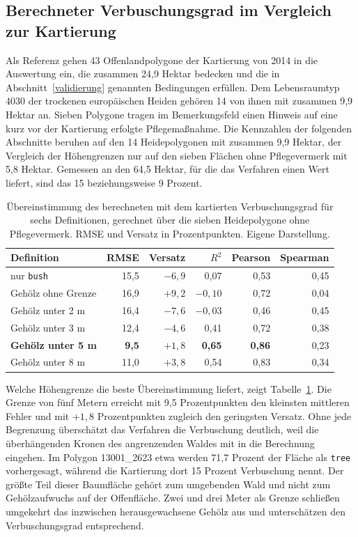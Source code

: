\subsection{Berechneter Verbuschungsgrad im Vergleich zur Kartierung}\label{ergebnis_quantifizierung}

Als Referenz gehen 43 Offenlandpolygone der Kartierung von 2014 in die Auswertung ein, die zusammen 24,9 Hektar bedecken und die in Abschnitt~\ref{validierung} genannten Bedingungen erfüllen. Dem Lebensraumtyp 4030 der trockenen europäischen Heiden gehören 14 von ihnen mit zusammen 9,9 Hektar an. Sieben Polygone tragen im Bemerkungsfeld einen Hinweis auf eine kurz vor der Kartierung erfolgte Pflegemaßnahme. Die Kennzahlen der folgenden Abschnitte beruhen auf den 14 Heidepolygonen mit zusammen 9,9 Hektar, der Vergleich der Höhengrenzen nur auf den sieben Flächen ohne Pflegevermerk mit 5,8 Hektar. Gemessen an den 64,5 Hektar, für die das Verfahren einen Wert liefert, sind das 15 beziehungsweise 9 Prozent.

\begin{table}[H]
    \centering
    \caption[Vergleich der Verbuschungsdefinitionen]{Übereinstimmung des
    berechneten mit dem kartierten Verbuschungsgrad für sechs Definitionen,
    gerechnet über die sieben Heidepolygone ohne Pflegevermerk. RMSE und
    Versatz in Prozentpunkten. Eigene Darstellung.}
    \label{tab:hoehengrenze}
    \begin{tabular}{lrrrrr}
    \hline
    Definition & RMSE & Versatz & $R^2$ & Pearson & Spearman \\
    \hline
    nur \texttt{bush}          & 15,5 & $-6,9$ & 0,07 & 0,53 & 0,45 \\
    Gehölz ohne Grenze         & 16,9 & $+9,2$ & $-0,10$ & 0,72 & 0,04 \\
    Gehölz unter 2 m           & 16,4 & $-7,6$ & $-0,03$ & 0,46 & 0,45 \\
    Gehölz unter 3 m           & 12,4 & $-4,6$ & 0,41 & 0,72 & 0,38 \\
    \textbf{Gehölz unter 5 m}  & \textbf{9,5} & \textbf{$+1,8$} & \textbf{0,65} & \textbf{0,86} & 0,23 \\
    Gehölz unter 8 m           & 11,0 & $+3,8$ & 0,54 & 0,83 & 0,34 \\
    \hline
    \end{tabular}
\end{table}

Welche Höhengrenze die beste Übereinstimmung liefert, zeigt Tabelle~\ref{tab:hoehengrenze}. Die Grenze von fünf Metern erreicht mit 9,5 Prozentpunkten den kleinsten mittleren Fehler und mit $+1,8$ Prozentpunkten zugleich den geringsten Versatz. Ohne jede Begrenzung überschätzt das Verfahren die Verbuschung deutlich, weil die überhängenden Kronen des angrenzenden Waldes mit in die Berechnung eingehen. Im Polygon 13001\_2623 etwa werden 71,7 Prozent der Fläche als \texttt{tree} vorhergesagt, während die Kartierung dort 15 Prozent Verbuschung nennt. Der größte Teil dieser Baumfläche gehört zum umgebenden Wald und nicht zum Gehölzaufwuchs auf der Offenfläche. Zwei und drei Meter als Grenze schließen umgekehrt das inzwischen herausgewachsene Gehölz aus und unterschätzen den Verbuschungsgrad entsprechend.


